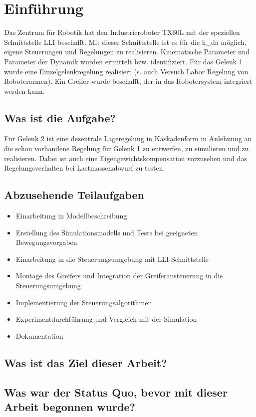 \documentclass[a4paper,12pt]{article}
\begin{document}
\section{Einführung}
Das Zentrum für Robotik hat den Industrieroboter TX60L mit der speziellen Schnittstelle \ac{LLI} beschafft. Mit dieser Schnittstelle ist es für die h\_da möglich, eigene Steuerungen und Regelungen zu realisieren. Kinematische Parameter und Parameter der Dynamik wurden ermittelt bzw. identifiziert\cite{D.X.Nodem.2015}. Für das Gelenk 1 wurde eine Einzelgelenkregelung realisiert (s. auch Versuch Labor Regelung von Roboterarmen). Ein Greifer wurde beschafft, der in das Robotersystem integriert werden kann.
\subsection{Was ist die Aufgabe?}
Für Gelenk 2 ist eine dezentrale Lageregelung in Kaskadenform in Anlehnung an die schon vorhandene Regelung für Gelenk 1 zu entwerfen, zu simulieren und zu realisieren. Dabei ist auch eine Eigengewichtskompensation vorzusehen und das Regelungsverhalten bei Lastmassenabwurf zu testen.
\subsection{Abzusehende Teilaufgaben}
\begin{itemize}
	\item Einarbeitung in Modellbeschreibung
	\item Erstellung des Simulationsmodells und Tests bei geeigneten Bewegungsvorgaben
	\item Einarbeitung in die Steuerungsumgebung mit LLI-Schnittstelle
	\item Montage des Greifers und Integration der Greiferansteuerung in die Steuerungsumgebung
	\item Implementierung der Steuerungsalgorithmen
	\item Experimentdurchführung und Vergleich mit der Simulation
	\item Dokumentation
\end{itemize}
\subsection{Was ist das Ziel dieser Arbeit?}

\subsection{Was war der Status Quo, bevor mit dieser Arbeit begonnen wurde?}
\end{document}
